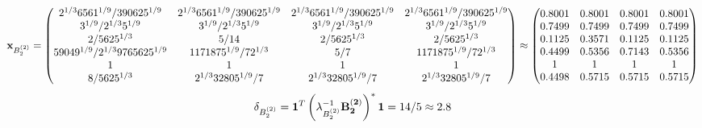 \documentclass[10pt,a4paper]{article}
\begin{document}
	\[
		\bold{x}_{B_2^{(2)}} = 
		\begin{pmatrix}
			{{2^ {1 / 3}}{6561^ {1 / 9}}} / {{390625^ {1 / 9}}} & {{2^ {1 / 3}}{6561^ {1 / 9}}} / {{390625^ {1 / 9}}} & {{2^ {1 / 3}}{6561^ {1 / 9}}} / {{390625^ {1 / 9}}} & {{2^ {1 / 3}}{6561^ {1 / 9}}} / {{390625^ {1 / 9}}} \\
			{{3^ {1 / 9}}} / {{2^ {1 / 3}}{5^ {1 / 9}}} & {{3^ {1 / 9}}} / {{2^ {1 / 3}}{5^ {1 / 9}}} & {{3^ {1 / 9}}} / {{2^ {1 / 3}}{5^ {1 / 9}}} & {{3^ {1 / 9}}} / {{2^ {1 / 3}}{5^ {1 / 9}}} \\
			{{2}} / {{5625^ {1 / 3}}} & {{5}} / {{14}} & {{2}} / {{5625^ {1 / 3}}} & {{2}} / {{5625^ {1 / 3}}} \\
			{{59049^ {1 / 9}}} / {{2^ {1 / 3}}{9765625^ {1 / 9}}} & {{1171875^ {1 / 9}}} / {{7}{2^ {1 / 3}}} & {{5}} / {{7}} & {{1171875^ {1 / 9}}} / {{7}{2^ {1 / 3}}} \\
			{1}{} & {1}{} & {1}{} & {1}{} \\
			{{8}} / {{5625^ {1 / 3}}} & {{2^ {1 / 3}}{32805^ {1 / 9}}} / {{7}} & {{2^ {1 / 3}}{32805^ {1 / 9}}} / {{7}} & {{2^ {1 / 3}}{32805^ {1 / 9}}} / {{7}} \\
		\end{pmatrix}
		\approx
		\begin{pmatrix}
			0.8001   & 0.8001   & 0.8001   & 0.8001   \\
			0.7499   & 0.7499   & 0.7499   & 0.7499   \\
			0.1125   & 0.3571   & 0.1125   & 0.1125   \\
			0.4499   & 0.5356   & 0.7143   & 0.5356   \\
			1        & 1        & 1        & 1        \\
			0.4498   & 0.5715   & 0.5715   & 0.5715   \\
		\end{pmatrix}
	\]
	\[
		\delta_{B_2^{(2)}} = \bold{1}^T \left(\lambda_{B_2^{(2)}}^{-1}\bold{B_2^{(2)}}\right)^* \bold{1} = {{14}} / {{5}}\approx 2.8
	\]
\end{document}
